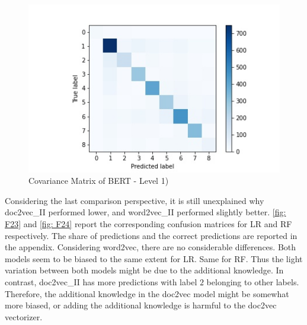 \documentclass[12pt, a4paper, titlepage]{article}
\begin{document}
\begin{figure}[hb!]
  \center
  \includegraphics[scale=0.5]{cm_bert_clf_l1.jpg}
  \caption{\label{fig: F25} Covariance Matrix of \ac{BERT} - Level 1)}
\end{figure}



Considering the last comparison perspective, it is still unexplained why doc2vec\_II performed lower, and word2vec\_II performed slightly better. \ref{fig: F23} and \ref{fig: F24} report the corresponding confusion matrices for \ac{LR} and \ac{RF} respectively. The share of predictions and the correct predictions are reported in the appendix. Considering word2vec, there are no considerable differences. Both models seem to be biased to the same extent for \ac{LR}. Same for \ac{RF}. Thus the light variation between both models might be due to the additional knowledge. In contrast, doc2vec\_II has more predictions with label $2$ belonging to other labels. Therefore, the additional knowledge in the doc2vec model might be somewhat more biased, or adding the additional knowledge is harmful to the doc2vec vectorizer. 
\end{document}
